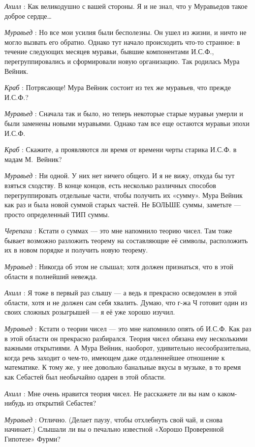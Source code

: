 \documentclass[../main.tex]{subfiles}
\begin{document}
\begin{dialogue}
\emph{Ахилл} : Как великодушно с вашей стороны. Я и не знал, что у Муравьедов такое доброе сердце\ldots{}

\emph{Муравьед} : Но все мои усилия были бесполезны. Он ушел из жизни, и ничто не могло вызвать его обратно. Однако тут начало происходить что-то странное: в течение следующих месяцев муравьи, бывшие компонентами И.С.Ф., перегруппировались и сформировали новую организацию. Так родилась Мура Вейник.

\emph{Краб} : Потрясающе! Мура Вейник состоит из тех же муравьев, что прежде И.С.Ф.?

\emph{Муравьед} : Сначала так и было, но теперь некоторые старые муравьи умерли и были заменены новыми муравьями. Однако там все еще остаются муравьи эпохи И.С.Ф.

\emph{Краб} : Скажите, а проявляются ли время от времени черты старика И.С.Ф. в мадам М.~Вейник?

\emph{Муравьед} : Ни одной. У них нет ничего общего. И я не вижу, откуда бы тут взяться сходству. В конце концов, есть несколько различных способов перегруппировать отдельные части, чтобы получить их «сумму». Мура Вейник как раз и была новой суммой старых частей. Не БОЛЬШЕ суммы, заметьте --- просто определенный ТИП суммы.

\emph{Черепаха} : Кстати о суммах --- это мне напомнило теорию чисел. Там тоже бывает возможно разложить теорему на составляющие её символы, расположить их в новом порядке и получить новую теорему.

\emph{Муравьед} : Никогда об этом не слышал; хотя должен признаться, что в этой области я полнейший невежда.

\emph{Ахилл} : Я тоже в первый раз слышу --- а ведь я прекрасно осведомлен в этой области, хотя и не должен сам себя хвалить. Думаю, что г-жа Ч готовит один из своих сложных розыгрышей --- я её уже хорошо изучил.

\emph{Муравьед} : Кстати о теории чисел --- это мне напомнило опять об И.С.Ф. Как раз в этой области он прекрасно разбирался. Теория чисел обязана ему несколькими важными открытиями. А Мура Вейник, наоборот, удивительно несообразительна, когда речь заходит о чем-то, имеющем даже отдаленнейшее отношение к математике. К тому же, у нее довольно банальные вкусы в музыке, в то время как Себастей был необычайно одарен в этой области.

\emph{Ахилл} : Мне очень нравится теория чисел. Не расскажете ли вы нам о каком-нибудь из открытий Себастея?

\emph{Муравьед} : Отлично. (Делает паузу, чтобы отхлебнуть свой чай, и снова начинает.) Слышали ли вы о печально известной «Хорошо Проверенной Гипотезе» Фурми?


\end{dialogue}
\end{document}
